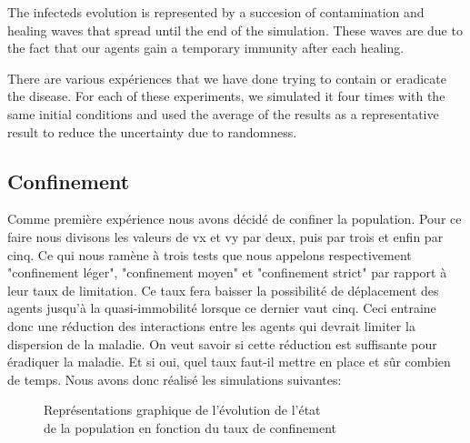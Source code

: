 \documentclass[a4paper, 12pt]{report}
\begin{document}
The infecteds evolution is represented by a succesion of contamination and healing waves that spread until the end of the simulation. These waves are due to the fact that our agents
gain a temporary immunity after each healing.

\vspace{0.8cm}

There are various expériences that we have done trying to contain or eradicate the disease. For each of these experiments, we simulated it four times with the same initial conditions
and used the average of the results as a representative result to reduce the uncertainty due to randomness.

\newpage

\subsection{Confinement}
Comme première expérience nous avons décidé de confiner la population. Pour ce faire nous divisons les
valeurs de vx et vy par deux, puis par trois et enfin par cinq. Ce qui nous ramène à trois tests que nous
appelons respectivement "confinement léger", "confinement moyen" et "confinement strict" par rapport à leur
taux de limitation. Ce taux fera baisser la possibilité de déplacement des agents jusqu'à la quasi-immobilité
lorsque ce dernier vaut cinq. Ceci entraine donc une réduction des interactions entre les agents qui devrait
limiter la dispersion de la maladie. On veut savoir si cette réduction est suffisante pour éradiquer la maladie. Et
si oui, quel taux faut-il mettre en place et sûr combien de temps. Nous avons donc réalisé les simulations
suivantes:

\begin{figure}[h]
	\centering
	\qquad
	\centering
	\qquad
	\caption{Représentations graphique de l'évolution de l'état\\ de la population en fonction du taux de confinement}

\end{figure}
\newpage
\end{document}
